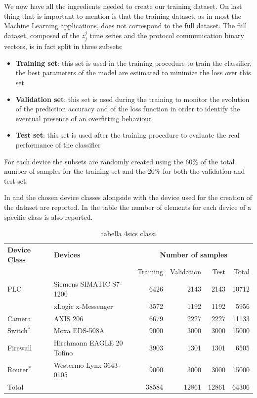We now have all the ingredients needed to create our training dataset. On last thing that is important to mention is that the training dataset, as in most the Machine Learning applications,
does not correspond to the full dataset. The full dataset, composed of the $\bar{z}_j^j$ time series and the protocol communication binary vectors, is in fact split in three subsets:
\begin{itemize}
    \item \textbf{Training set}: this set is used in the training procedure to train the classifier, the best parameters of the model are estimated to minimize the loss over this set
    \item \textbf{Validation set}: this set is used during the training to monitor the evolution of the prediction accuracy and of the loss function in order to identify the eventual presence of an overfitting behaviour 
    \item \textbf{Test set}: this set is used after the training procedure to evaluate the real performance of the classifier
\end{itemize}

For each device the subsets are randomly created using the 60\% of the total number of samples for the training set and the 20\% for both the validation and test set.

In  and  the chosen device classes alongside with the device used for the creation of the dataset are reported. In the table the number of elements for each device of a specific class is also reported.




\begin{table}
\centering
\begin{tabular}{llrrrr}
\toprule
\textbf{Device Class} & \textbf{Devices} & \multicolumn{4}{c}{\textbf{Number of samples}} \\
& & Training & Validation & Test & Total \\
\midrule
\multirow{1}{*}{PLC} & Siemens SIMATIC S7-1200 & 6426 & 2143 & 2143 & 10712  \\
                     & xLogic x-Messenger & 3572 & 1192 & 1192 & 5956  \\
\midrule
\multirow{1}{*}{Camera}  & AXIS 206 & 6679 & 2227 & 2227 & 11133 \\
\midrule
\multirow{1}{*}{Switch$^*$} & Moxa EDS-508A  & 9000 & 3000 & 3000 & 15000 \\
\midrule
\multirow{1}{*}{Firewall}& Hirchmann EAGLE 20 Tofino & 3903 & 1301 & 1301 & 6505 \\
\midrule
\multirow{1}{*}{Router$^*$} & Westermo Lynx 3643-0105  & 9000 & 3000 & 3000 & 15000  \\ 
\midrule
\midrule
Total & & 38584 & 12861 & 12861 & 64306 \\
\bottomrule
\end{tabular}
\caption{tabella 4sics classi}
\label{tab:4sicsdev}
\end{table}











